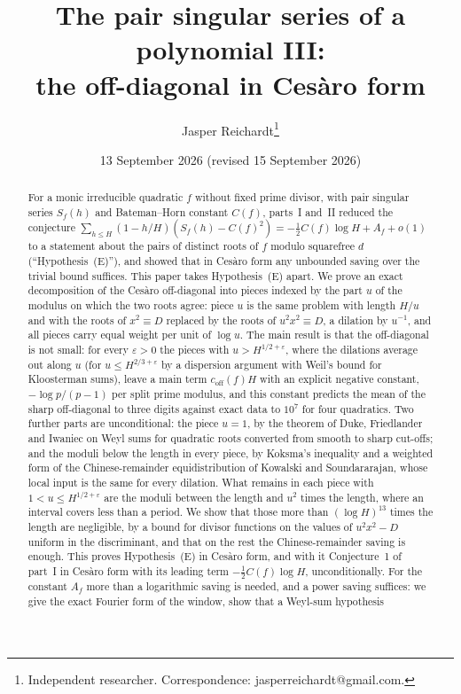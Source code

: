 \documentclass[11pt,a4paper]{article}
\title{The pair singular series of a polynomial III:\\ the off-diagonal in Ces\`aro form}
\author{Jasper Reichardt\thanks{Independent researcher. Correspondence: jasperreichardt@gmail.com.}}
\date{13 September 2026 (revised 15 September 2026)}
\theoremstyle{remark}\newtheorem{remark}[theorem]{Remark}
\begin{document}
\maketitle

\begin{abstract}
For a monic irreducible quadratic $f$ without fixed prime divisor, with pair singular series $S_f(h)$ and Bateman--Horn constant $C(f)$,
parts~I and~II reduced the conjecture $\sum_{h\le H}(1-h/H)(S_f(h)-C(f)^2)=-\tfrac12C(f)\log H+A_f+o(1)$ to a statement
about the pairs of distinct roots of $f$ modulo squarefree $d$ (``Hypothesis~(E)''), and showed that in
Ces\`aro form any unbounded saving over the trivial bound suffices. This paper takes Hypothesis~(E) apart. We
prove an exact decomposition of the Ces\`aro off-diagonal into pieces indexed by the part $u$ of the modulus on
which the two roots agree: piece $u$ is the same problem with length $H/u$ and with the roots of
$x^2\equiv D$ replaced by the roots of $u^2x^2\equiv D$, a dilation by $u^{-1}$, and all pieces carry equal
weight per unit of $\log u$. The main result is that the off-diagonal is not small: for every $\varepsilon>0$ the pieces with $u>H^{1/2+\varepsilon}$,
where the dilations average out along $u$ (for $u\le H^{2/3+\varepsilon}$ by a dispersion argument with Weil's bound for Kloosterman sums), leave a main term $c_{\mathrm{off}}(f)H$ with an explicit negative
constant, $-\log p/(p-1)$ per split prime modulus, and this constant predicts the mean of the sharp off-diagonal
to three digits against exact data to $10^7$ for four quadratics. Two further parts are unconditional: the piece
$u=1$, by the theorem of Duke, Friedlander and Iwaniec on Weyl sums for quadratic roots converted from smooth to
sharp cut-offs; and the moduli below the length in every piece, by Koksma's inequality and a weighted form of the
Chinese-remainder equidistribution of Kowalski and Soundararajan, whose local input is the same for every
dilation. What remains in each piece with $1<u\le H^{1/2+\varepsilon}$ are
the moduli between the length and $u^2$ times the length, where an interval covers less than a period. We show that
those more than $(\log H)^{13}$ times the length are negligible, by a bound for divisor functions on the values of $u^2x^2-D$ uniform in the
discriminant, and that on the rest the Chinese-remainder saving is enough. This proves Hypothesis~(E) in Ces\`aro form,
and with it Conjecture~1 of part~I in Ces\`aro form with its leading term $-\tfrac12C(f)\log H$, unconditionally. For the
constant $A_f$ more than a logarithmic saving is needed, and a power saving suffices: we give the exact Fourier form of the window, show that a Weyl-sum hypothesis

\end{abstract}
\end{document}
